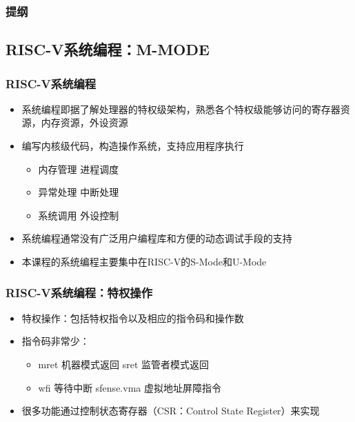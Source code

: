 \begin{frame}
    \frametitle{提纲} 
    \tableofcontents 
\end{frame}

\subsection{RISC-V系统编程：M-MODE}

\begin{frame}
    \frametitle{RISC-V系统编程}
    \begin{itemize}
        \item 系统编程即据了解处理器的特权级架构，熟悉各个特权级能够访问的寄存器资源，内存资源，外设资源        
        \item 编写内核级代码，构造操作系统，支持应用程序执行
        \begin{itemize}
            \item 内存管理 \quad 进程调度
            \item 异常处理 \quad 中断处理
            \item 系统调用 \quad 外设控制
        \end{itemize}				
        \item 系统编程通常没有广泛用户编程库和方便的动态调试手段的支持
        \item 本课程的系统编程主要集中在RISC-V的S-Mode和U-Mode
    \end{itemize}
    
\end{frame}


\begin{frame}
    \frametitle{RISC-V系统编程：特权操作}
    \begin{itemize}
        \item 特权操作：包括特权指令以及相应的指令码和操作数       
        \item 指令码非常少：
        \begin{itemize}
            \item mret 机器模式返回 \quad sret 监管者模式返回
            \item wfi 等待中断 \quad \quad \quad \quad sfense.vma 虚拟地址屏障指令
        \end{itemize}				
        \item 很多功能通过控制状态寄存器（CSR：Control State Register）来实现
    \end{itemize}
    
\end{frame}

